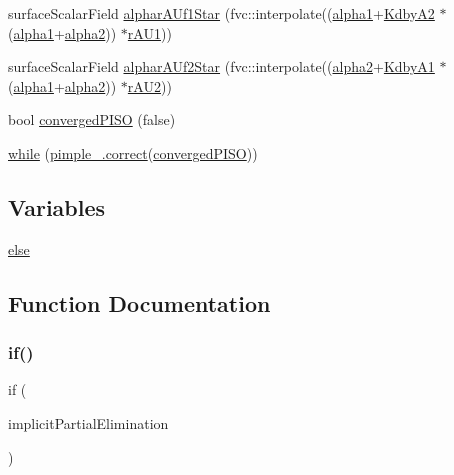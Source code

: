 \begin{DoxyCompactItemize}
\item 
surface\+Scalar\+Field \hyperlink{pEqn__2p_8H_aaf8fbbaf2280de48f6f99e10fd565b16}{alphar\+A\+Uf1\+Star} (fvc\+::interpolate((\hyperlink{UEqns__2p_8H_ad67e06bee4c61d3ec617e035493b4722}{alpha1}+\hyperlink{pEqn__2p_8H_a3b3d5399abb38ee13b6d3d80644e8bfa}{Kdby\+A2} $\ast$(\hyperlink{UEqns__2p_8H_ad67e06bee4c61d3ec617e035493b4722}{alpha1}+\hyperlink{UEqns__2p_8H_abe544d8197b804c4439afde6d860d5d7}{alpha2})) $\ast$\hyperlink{pEqn__2p_8H_a69f7869c92c05533e05895da3a3a1ffc}{r\+A\+U1}))
\item 
surface\+Scalar\+Field \hyperlink{pEqn__2p_8H_a8baa7e71ccbd107a37547e28d03f911a}{alphar\+A\+Uf2\+Star} (fvc\+::interpolate((\hyperlink{UEqns__2p_8H_abe544d8197b804c4439afde6d860d5d7}{alpha2}+\hyperlink{pEqn__2p_8H_a6b7c38ee9390c649d0a54588ccfb6d1b}{Kdby\+A1} $\ast$(\hyperlink{UEqns__2p_8H_ad67e06bee4c61d3ec617e035493b4722}{alpha1}+\hyperlink{UEqns__2p_8H_abe544d8197b804c4439afde6d860d5d7}{alpha2})) $\ast$\hyperlink{pEqn__2p_8H_a92380f46444d6e0ea5bf66657c37f11b}{r\+A\+U2}))
\item 
bool \hyperlink{pEqn__2p_8H_a7378b3cca14609b2f41dab30069eb9c4}{converged\+P\+I\+SO} (false)
\item 
\hyperlink{pEqn__2p_8H_a6e6ddb24845d3c5c3906e45d968e9448}{while} (\hyperlink{hEqn_8H_a3a2458f7f54158be848527a3fdedd5dd}{pimple\+\_\+.\+correct}(\hyperlink{pEqnf__2p_8H_a7378b3cca14609b2f41dab30069eb9c4}{converged\+P\+I\+SO}))
\end{DoxyCompactItemize}
\subsection*{Variables}
\begin{DoxyCompactItemize}
\item 
\hyperlink{pEqn__2p_8H_a0544c3fe466e421738dae463968b70ba}{else}
\end{DoxyCompactItemize}


\subsection{Function Documentation}
\mbox{\label{pEqn__2p_8H_a5ae53f39028b227fab81abc22e3286d6}} 
\subsubsection{\texorpdfstring{if()}{if()}}
{\footnotesize\ttfamily if (\begin{DoxyParamCaption}\item[{!}]{implicit\+Partial\+Elimination }\end{DoxyParamCaption})}



